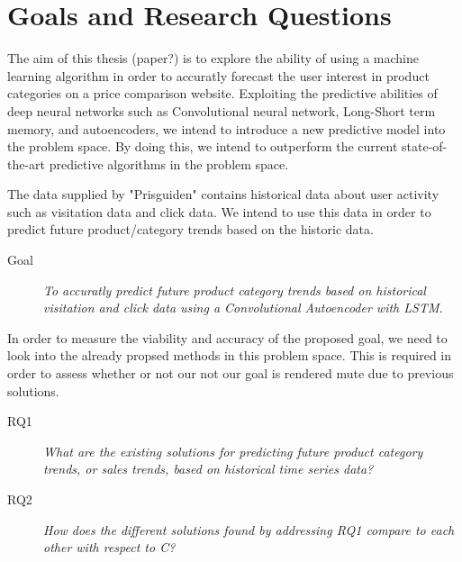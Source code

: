 \section{Goals and Research Questions}
\label{sec:Goals and Research Questions}


The aim of this thesis (paper?) is to explore the ability of using a machine learning algorithm in order to accuratly forecast the user interest in product categories on a price comparison website.
Exploiting the predictive abilities of deep neural networks such as Convolutional neural network, Long-Short term memory, and autoencoders,
we intend to introduce a new predictive model into the problem space.
By doing this, we intend to outperform the current state-of-the-art predictive algorithms in the problem space.

The data supplied by "Prisguiden" contains historical data about user activity such as visitation data and click data.
We intend to use this data in order to predict future product/category trends based on the historic data.

\begin{description}
    \item[Goal]{\it To accuratly predict future product category trends based on historical visitation and click data using a Convolutional Autoencoder with LSTM.}
\end{description}

In order to measure the viability and accuracy of the proposed goal, we need to look into the already propsed methods in this problem space.
This is required in order to assess whether or not our not our goal is rendered mute due to previous solutions.


\begin{description}
    \item[RQ1]{\it What are the existing solutions for predicting future product category trends, or sales trends, based on historical time series data?}
\end{description}

\begin{description}
    \item[RQ2]{\it How does the different solutions found by addressing RQ1 compare to each other with respect to C?} 
\end{description}

